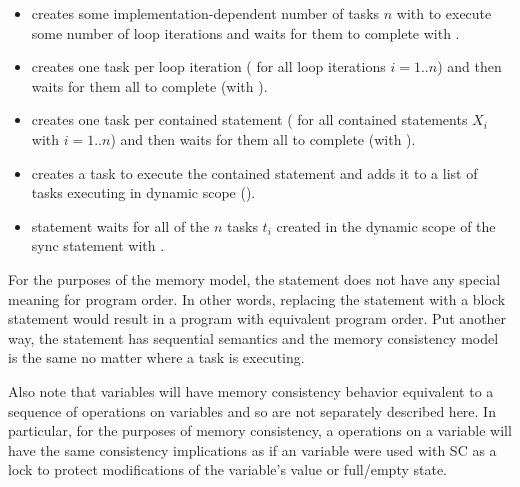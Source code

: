 \begin{itemize}

  \item {} creates some implementation-dependent number of tasks $n$
with  to execute some number of loop
iterations and waits for them to complete with .

  \item {} creates one task per loop iteration ( for all loop iterations $i=1..n$) and then waits for them
all to complete (with ).

  \item {} creates one task per contained statement ( for all contained statements $X_i$ with $i=1..n$) and then
waits for them all to complete (with ).

  \item {} creates a task to execute the contained statement and adds
it to a list of tasks executing in dynamic scope ().

  \item {} statement waits for all of the $n$ tasks $t_i$ created in
the dynamic scope of the sync statement with .

\end{itemize}

For the purposes of the memory model, the  statement does not have any
special meaning for program order. In other words, replacing the 
statement with a block statement would result in a program with equivalent
program order. Put another way, the  statement has sequential
semantics and the memory consistency model is the same no matter where a task
is executing.

Also note that  variables will have memory consistency behavior
equivalent to a sequence of operations on  variables and so are
not separately described here. In particular, for the purposes of memory
consistency, a operations on a  variable will have the same
consistency implications as if an  variable were used with
SC as a lock to protect modifications of the 
variable's value or full/empty state.


